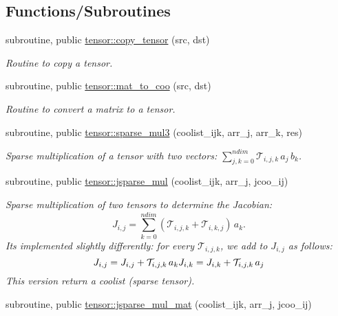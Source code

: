 \subsection*{Functions/\+Subroutines}
\begin{DoxyCompactItemize}
\item 
subroutine, public \hyperlink{namespacetensor_a4a88ee8077278486c5128ad97617969e}{tensor\+::copy\+\_\+tensor} (src, dst)
\begin{DoxyCompactList}\small\item\em Routine to copy a tensor. \end{DoxyCompactList}\item 
subroutine, public \hyperlink{namespacetensor_a75d1a9ca8b39e9ad4b151a7b4b45c70f}{tensor\+::mat\+\_\+to\+\_\+coo} (src, dst)
\begin{DoxyCompactList}\small\item\em Routine to convert a matrix to a tensor. \end{DoxyCompactList}\item 
subroutine, public \hyperlink{namespacetensor_a11054027a386918658f8948231af53b1}{tensor\+::sparse\+\_\+mul3} (coolist\+\_\+ijk, arr\+\_\+j, arr\+\_\+k, res)
\begin{DoxyCompactList}\small\item\em Sparse multiplication of a tensor with two vectors\+: ${\displaystyle \sum_{j,k=0}^{ndim}} \mathcal{T}_{i,j,k} \, a_j \,b_k$. \end{DoxyCompactList}\item 
subroutine, public \hyperlink{namespacetensor_add2a6aa993cd8a23be60d1643b5c7942}{tensor\+::jsparse\+\_\+mul} (coolist\+\_\+ijk, arr\+\_\+j, jcoo\+\_\+ij)
\begin{DoxyCompactList}\small\item\em Sparse multiplication of two tensors to determine the Jacobian\+: \[J_{i,j} = {\displaystyle \sum_{k=0}^{ndim}} \left( \mathcal{T}_{i,j,k} + \mathcal{T}_{i,k,j} \right) \, a_k.\] It\textquotesingle{}s implemented slightly differently\+: for every $\mathcal{T}_{i,j,k}$, we add to $J_{i,j}$ as follows\+: \[J_{i,j} = J_{i,j} + \mathcal{T}_{i,j,k} \, a_k \\ J_{i,k} = J_{i,k} + \mathcal{T}_{i,j,k} \, a_j\] This version return a coolist (sparse tensor). \end{DoxyCompactList}\item 
subroutine, public \hyperlink{namespacetensor_a4135cf70df5030070922ff199c79cc03}{tensor\+::jsparse\+\_\+mul\+\_\+mat} (coolist\+\_\+ijk, arr\+\_\+j, jcoo\+\_\+ij)

\end{DoxyCompactItemize}
